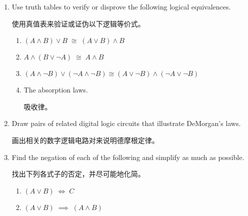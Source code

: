 \begin{enumerate}
{  \vfill
  
  \rule{0pt}{0pt}
   }
   
   \workbookpagebreak
  \hintspagebreak
   
  \item Use truth tables to verify or disprove the following 
  logical equivalences.
  
  使用真值表来验证或证伪以下逻辑等价式。
  \begin{enumerate}
  \item $(A \land B) \lor B \; \cong \; (A \lor B) \land B$
  \item $A \land (B \lor {\lnot}A) \; \cong \; A \land B $
  \item $(A \land {\lnot}B) \lor ({\lnot}A \land {\lnot}B) \cong
  (A \lor {\lnot}B) \land ({\lnot}A \lor {\lnot}B)$ 
  \item The absorption laws.
  
  吸收律。
  \end{enumerate}
  
  \wbvfill
  
  
  \workbookpagebreak
  
  \item Draw pairs of related digital logic circuits that illustrate
  DeMorgan's laws.
  
  画出相关的数字逻辑电路对来说明德摩根定律。
  \wbvfill
  
  
  \item Find the negation of each of the following and simplify as much as possible.
  
  找出下列各式子的否定，并尽可能地化简。
  \medskip
  
    \begin{enumerate}
    \item $(A \lor B) \; \iff \; C$
  \medskip
  
    \item $(A \lor B) \; \implies \; (A \land B)$
  
    \end{enumerate}
  

\end{enumerate}
